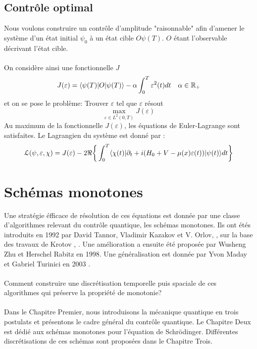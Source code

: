 \subsection*{Contrôle optimal}
Nous voulons construire un contrôle d'amplitude "raisonnable" afin d’amener le système d'un état initial $\psi_0$ à un état cible $O\psi(T)$. $O$ étant l'observable décrivant l'état cible.\\\\

On considère ainsi une fonctionnelle $J$
\begin{equation}
J(\varepsilon) = \langle \psi(T)|O|\psi(T) \rangle - \alpha \int_{0}^{T}\varepsilon^2(t)dt \quad \alpha \in \mathbb R_+
\end{equation}
et on se pose le problème: Trouver $\varepsilon$ tel que $\varepsilon$ résout
$$ \max_{\varepsilon \in L^2(0,T)} J(\varepsilon)$$
Au maximum de la fonctionnelle $J(\varepsilon)$, les équations de Euler-Lagrange sont satisfaites. Le Lagrangien du système est donné par :
\begin{equation} \label{lagrangien}
\mathcal{L}(\psi,\varepsilon,\chi)= J(\varepsilon)\\
-2\Re \bigg\{ \int_{0}^{T}\langle \chi (t)|\partial_{t}+i(H_0+V-\mu(x)\varepsilon(t))|\psi(t) \rangle dt \bigg\}
\end{equation}
\section*{Schémas monotones}
Une stratégie éfficace de résolution de ces équations est donnée par une classe d’algorithmes relevant du contrôle quantique, les schémas monotones. Ils ont étés introduits en 1992 par David Tannor, Vladimir Kazakov et V. Orlov,  \cite{Tannor}, sur la base des travaux de Krotov \cite{Krotov1}, \cite{Krotov2}. Une amélioration a ensuite été proposée par Wusheng Zhu et Herschel Rabitz \cite{Zhu} en 1998. Une généralisation est donnée par Yvon Maday et Gabriel Turinici en 2003 \cite{Maday}.\\\\

Comment construire une discrétisation temporelle puis spaciale de ces algorithmes qui préserve la propriété de monotonie?\\\\

Dans le Chapitre Premier, nous introduisons la mécanique quantique en trois postulats et présentons le cadre général du contrôle quantique. Le Chapitre Deux est dédié aux schémas monotones pour l'équation de Schrödinger.
Différentes discrétisations de ces schémas sont proposées dans le Chapitre Trois.